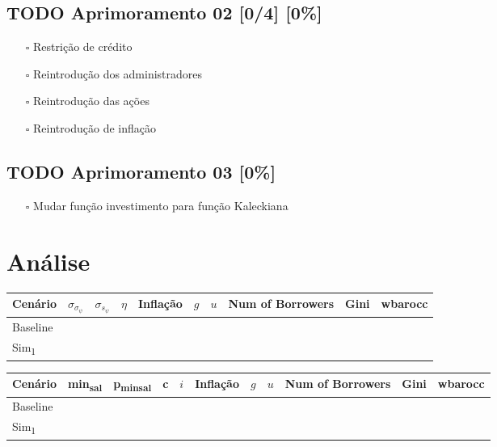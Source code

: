 \documentclass[11pt]{article}
\begin{document}
\subsection{{\bfseries\sffamily TODO} Aprimoramento 02 [0/4] [0\%]}
\label{sec:orgdf75752}
\begin{itemize}
\item[{$\square$}] Restrição de crédito
\item[{$\square$}] Reintrodução dos administradores
\item[{$\square$}] Reintrodução das ações
\item[{$\square$}] Reintrodução de inflação
\end{itemize}

\subsection{{\bfseries\sffamily TODO} Aprimoramento 03  [0\%]}
\label{sec:org2ae60fa}
\begin{itemize}
\item[{$\square$}] Mudar função investimento para função Kaleckiana
\end{itemize}
\section{Análise}
\label{sec:org773bf87}

\begin{table}[htbp]
\label{tab:orgb3624bf}
\centering
\begin{tabular}{llllllllll}
Cenário & \(\sigma_{\sigma_\psi}\) & \(\sigma_{s_\psi}\) & \(\eta\) & Inflação & \(g\) & \(u\) & Num of Borrowers & Gini & wbarocc\\
\hline
Baseline &  &  &  &  &  &  &  &  & \\
Sim\textsubscript{1} &  &  &  &  &  &  &  &  & \\
\end{tabular}
\end{table}


\begin{table}[htbp]
\label{tab:org48bf6a1}
\centering
\begin{tabular}{lllllllllll}
Cenário & min\textsubscript{sal} & p\textsubscript{minsal} & c & \(i\) & Inflação & \(g\) & \(u\) & Num of Borrowers & Gini & wbarocc\\
\hline
Baseline &  &  &  &  &  &  &  &  &  & \\
Sim\textsubscript{1} &  &  &  &  &  &  &  &  &  & \\
\end{tabular}
\end{table}
\end{document}

